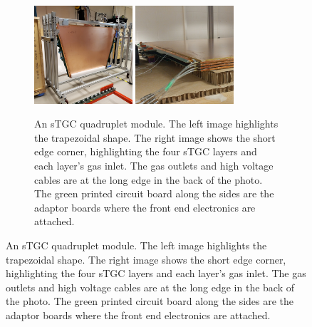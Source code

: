 \begin{figure}
\centering
\begin{subfigure}{\textwidth}
  \centering
  \includegraphics[width=0.4\textwidth]{figures/stgc_quad_cart.jpg}
  \includegraphics[width=0.4\textwidth]{figures/stgc_quad_inlet_corner.jpg}
  \caption{An sTGC quadruplet module. The left image highlights the trapezoidal shape. The right image shows the short edge corner, highlighting the four sTGC layers and each layer's gas inlet. The gas outlets and high voltage cables are at the long edge in the back of the photo. The green printed circuit board along the sides are the adaptor boards where the front end electronics are attached.}
  \label{fig:stgc_quad}
\end{subfigure}

\smallskip


\end{figure}
